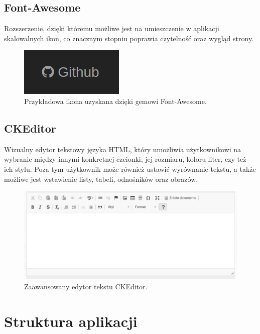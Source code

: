 \documentclass[brudnopis]{xmgr}
\begin{document}
\subsection{Font-Awesome}

Rozszerzenie, dzięki któremu możliwe jest na umieszczenie w aplikacji skalowalnych ikon, co znacznym stopniu poprawia czytelność oraz wygląd strony.

\begin{figure}[!tbh]
\centering
\includegraphics[scale=0.5]{fig/icon}
\caption{Przykładowa ikona uzyskana dzięki gemowi Font-Awesome.}
\end{figure}


\subsection{CKEditor}

Wizualny edytor tekstowy języka HTML, który umożliwia użytkownikowi na wybranie między innymi konkretnej
czcionki, jej rozmiaru, koloru liter, czy też ich stylu. Poza tym użytkownik może również ustawić wyrównanie tekstu,
a także możliwe jest wstawienie listy, tabeli, odnośników oraz obrazów.

\begin{figure}[!tbh]
\centering
\includegraphics[width=\linewidth]{fig/ckeditor}
\caption{Zaawansowany edytor tekstu CKEditor.}
\end{figure}

\newpage

\section{Struktura aplikacji}
\end{document}
